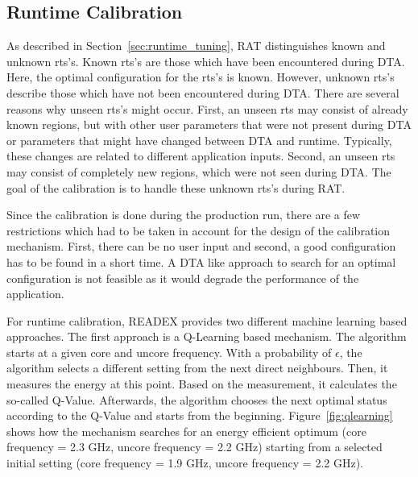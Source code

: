 \subsection{Runtime Calibration} \label{sec:calibration}

As described in Section~\ref{sec:runtime_tuning}, RAT distinguishes known and unknown rts's. 
Known rts's are those which have been encountered during DTA. Here, the optimal configuration for the rts's is known. However, unknown rts's describe those which have not been encountered during DTA. There are several reasons why unseen rts's might occur. First, an unseen rts may consist of already known regions, but with other user parameters that were not present during DTA or parameters that might have changed between DTA and runtime. Typically, these changes are related to different application inputs. Second, an unseen rts may consist of completely new regions, which were not seen during DTA. The goal of the calibration is to handle these unknown rts's during RAT.

Since the calibration is done during the production run, there are a few restrictions which had to be taken in account for the design of the calibration mechanism. First, there can be no user input and second, a good configuration has to be found in a short time. A DTA like approach to search for an optimal configuration is not feasible as it would degrade the performance of the application.

For runtime calibration, READEX provides two different machine learning based approaches. The first approach is a Q-Learning based mechanism. The algorithm starts at a given core and uncore frequency. With a probability of {$\epsilon$}, the algorithm selects a different setting from the next direct neighbours. Then, it measures the energy at this point. Based on the measurement, it calculates the so-called Q-Value. Afterwards, the algorithm chooses the next optimal status according to the Q-Value and starts from the beginning. Figure~\ref{fig:qlearning} shows how the mechanism searches for an energy efficient optimum (core frequency = 2.3 GHz, uncore frequency = 2.2 GHz) starting from a selected initial setting (core frequency = 1.9 GHz, uncore frequency = 2.2 GHz).

